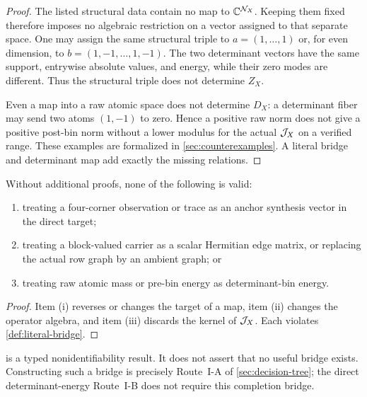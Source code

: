 \begin{proof}
The listed structural data contain no map to
\(\mathbb C^{\mathcal N_X}\).  Keeping them fixed therefore imposes no algebraic
restriction on a vector assigned to that separate space.  One may
assign the same structural triple to \(a=(1,\ldots,1)\) or, for even
dimension, to \(b=(1,-1,\ldots,1,-1)\).  The two determinant vectors
have the same support, entrywise absolute values, and energy, while
their zero modes are different.  Thus the structural triple does not
determine \(Z_X\).

Even a map into a raw atomic space does not determine \(D_X\): a
determinant fiber may send two atoms \((1,-1)\) to zero.  Hence a
positive raw norm does not give a positive post-bin norm without a
lower modulus for the actual \(\mathcal J_X\) on a verified range.  These
examples are formalized in \cref{sec:counterexamples}.  A literal
bridge and determinant map add exactly the missing relations.
\end{proof}

\begin{corollary}
\label{cor:prohibited-identifications}
Without additional proofs, none of the following is valid:
\begin{enumerate}[label=(\roman*),leftmargin=2.2em]
\item treating a four-corner observation or trace as an anchor
synthesis vector in the direct target;
\item treating a block-valued carrier as a scalar Hermitian edge
matrix, or replacing the actual row graph by an ambient graph; or
\item treating raw atomic mass or pre-bin energy as determinant-bin
energy.
\end{enumerate}
\end{corollary}

\begin{proof}
Item (i) reverses or changes the target of a map, item (ii) changes
the operator algebra, and item (iii) discards the kernel of
\(\mathcal J_X\).  Each violates \cref{def:literal-bridge}.
\end{proof}

\begin{remark}
 is a typed nonidentifiability result.  It
does not assert that no useful bridge exists.  Constructing such a
bridge is precisely Route~I-A of \cref{sec:decision-tree}; the direct
determinant-energy Route~I-B does not require this completion bridge.
\end{remark}
